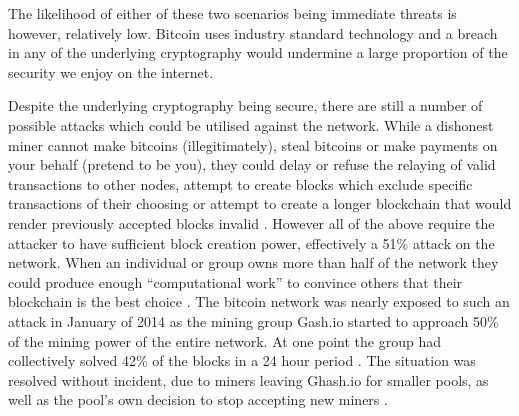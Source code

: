 \documentclass{article}
\begin{document}
The likelihood of either of these two scenarios being immediate threats is however, relatively low. Bitcoin uses industry standard technology and a breach in any of the underlying cryptography would undermine a large proportion of the security we enjoy on the internet. 

Despite the underlying cryptography being secure, there are still a number of possible attacks which could be utilised against the network. While a dishonest miner cannot make bitcoins (illegitimately), steal bitcoins or make payments on your behalf (pretend to be you), they could delay or refuse the relaying of valid transactions to other nodes, attempt to create blocks which exclude specific transactions of their choosing or attempt to create a longer blockchain that would render previously accepted blocks invalid \citep{22_brave_new_coin_2016}. However all of the above require the attacker to have sufficient block creation power, effectively a 51\% attack on the network. When an individual or group owns more than half of the network they could produce enough ``computational work'' to convince others that their blockchain is the best choice \citep{41_yang_2011}. The bitcoin network was nearly exposed to such an attack in January of 2014 as the mining group Gash.io started to approach 50\% of the mining power of the entire network. At one point the group had collectively solved 42\% of the blocks in a 24 hour period \citep{42_liu_2014}. The situation was resolved without incident, due to miners leaving Ghash.io for smaller pools, as well as the pool’s own decision to stop accepting new miners \citep{41_yang_2011}.
\end{document}
